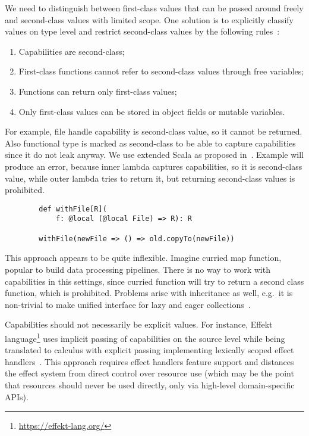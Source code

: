 \documentclass[conference]{IEEEtran}
\begin{document}
    We need to distinguish between first-class values that can be passed around freely and second-class values with limited scope.
    One solution is to explicitly classify values on type level and restrict second-class values by the following rules~\cite{osvald2016gentrification}:
    \begin{enumerate}
        \item Capabilities are second-class;
        \item First-class functions cannot refer to second-class values through free variables;
        \item Functions can return only first-class values;
        \item Only first-class values can be stored in object fields or mutable variables.
    \end{enumerate}

    For example, file handle capability is second-class value, so it cannot be returned.
    Also functional type is marked as second-class to be able to capture capabilities since it do not leak anyway.
    We use extended Scala as proposed in~\cite{osvald2016gentrification}.
    Example will produce an error, because inner lambda captures capabilities, so it is second-class value, while outer lambda tries to return it, but returning second-class values is prohibited.
    \begin{verbatim}
        def withFile[R](
            f: @local (@local File) => R): R

        withFile(newFile => () => old.copyTo(newFile))
    \end{verbatim}

    This approach appears to be quite inflexible.
    Imagine curried map function, popular to build data processing pipelines.
    There is no way to work with capabilities in this settings, since curried function will try to return a second class function, which is prohibited.
    Problems arise with inheritance as well, e.g.\ it is non-trivial to make unified interface for lazy and eager collections~\cite{osvald2016gentrification}.

    Capabilities should not necessarily be explicit values.
    For instance, Effekt language\footnote{\url{https://effekt-lang.org/}} uses implicit passing of capabilities on the source level while being translated to calculus with explicit passing implementing lexically scoped effect handlers~\cite{brachthauser2020effects}.
    This approach requires effect handlers feature support and distances the effect system from direct control over resource use (which may be the point that resources should never be used directly, only via high-level domain-specific APIs).
\end{document}
